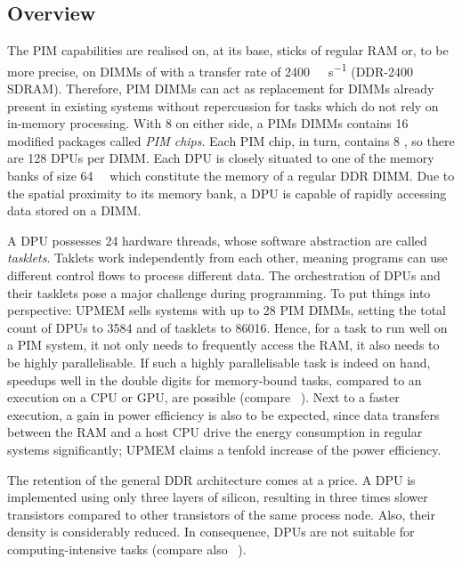 \subsection{Overview}
\label{sec:prereq:architecture:overview}

The \ac{PIM} capabilities are realised on, at its base, sticks of regular \ac{RAM} or, to be more precise, on \acp{DIMM} of \label{acro:DDR} \label{acro:SDRAM} with a transfer rate of \qty{2400}{\mega\transfer\per\second} (\acs{DDR}-2400 \acs{SDRAM}).
Therefore, \ac{PIM} \acp{DIMM} can act as replacement for \acp{DIMM} already present in existing systems without repercussion for tasks which do not rely on in-memory processing.
With 8 on either side, a \acp{PIM} \acp{DIMM} contains 16 modified  packages called \emph{PIM chips}.
Each \ac{PIM} chip, in turn, contains 8 , so there are 128 \acp{DPU} per \ac{DIMM}.
Each \ac{DPU} is closely situated to one of the memory banks of size \qty{64}{\mebi\byte} which constitute the memory of a regular \ac{DDR} \Ac{DIMM}.
Due to the spatial proximity to its memory bank, a \ac{DPU} is capable of rapidly accessing data stored on a \ac{DIMM}.

A \ac{DPU} possesses 24 hardware threads, whose software abstraction are called \emph{tasklets}.
Taklets work independently from each other, meaning programs can use different control flows to process different data.
The orchestration of \acp{DPU} and their tasklets pose a major challenge during programming.
To put things into perspective:
UPMEM sells systems with up to 28 \ac{PIM} \acp{DIMM}, setting the total count of \acp{DPU} to \num{3584} and of tasklets to \num{86016}.
Hence, for a task to run well on a \ac{PIM} system, it not only needs to frequently access the \ac{RAM}, it also needs to be highly parallelisable.
If such a highly parallelisable task is indeed on hand, speedups well in the double digits for memory-bound tasks, compared to an execution on a \ac{CPU} or \ac{GPU}, are possible (compare \citeauthor{mutlu2022Benchmarking}~\cite{mutlu2022Benchmarking}).
Next to a faster execution, a gain in power efficiency is also to be expected, since data transfers between the \ac{RAM} and a host \ac{CPU} drive the energy consumption in regular systems significantly;
UPMEM claims a tenfold increase of the power efficiency.

The retention of the general \ac{DDR} architecture comes at a price.
A \ac{DPU} is implemented using only three layers of silicon, resulting in three times slower transistors compared to other transistors of the same process node.
Also, their density is considerably reduced.
In consequence, \acp{DPU} are not suitable for computing-intensive tasks (compare also \citeauthor{mutlu2022Benchmarking}~\cite{mutlu2022Benchmarking}).
